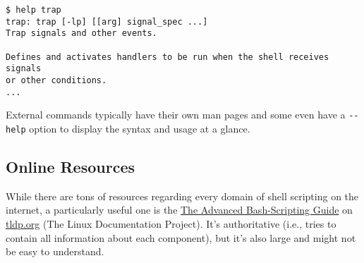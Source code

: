 \vspace{-15pt}
\begin{verbatim}
$ help trap
trap: trap [-lp] [[arg] signal_spec ...]
Trap signals and other events.

Defines and activates handlers to be run when the shell receives signals
or other conditions.
...
\end{verbatim}
\vspace{-10pt}	

\noindent
External commands typically have their own man pages and some even have a \verb|--help| option to display the syntax and usage at a glance. 

\subsection{Online Resources}
While there are tons of resources regarding every domain of shell scripting on the internet, a particularly useful one is the \href{http://www.tldp.org/LDP/abs/abs-guide.pdf}{The Advanced Bash-Scripting Guide} on \url{tldp.org} (The Linux Documentation Project). It's authoritative (i.e., tries to contain all information about each component), but it's also large and might not be easy to understand.